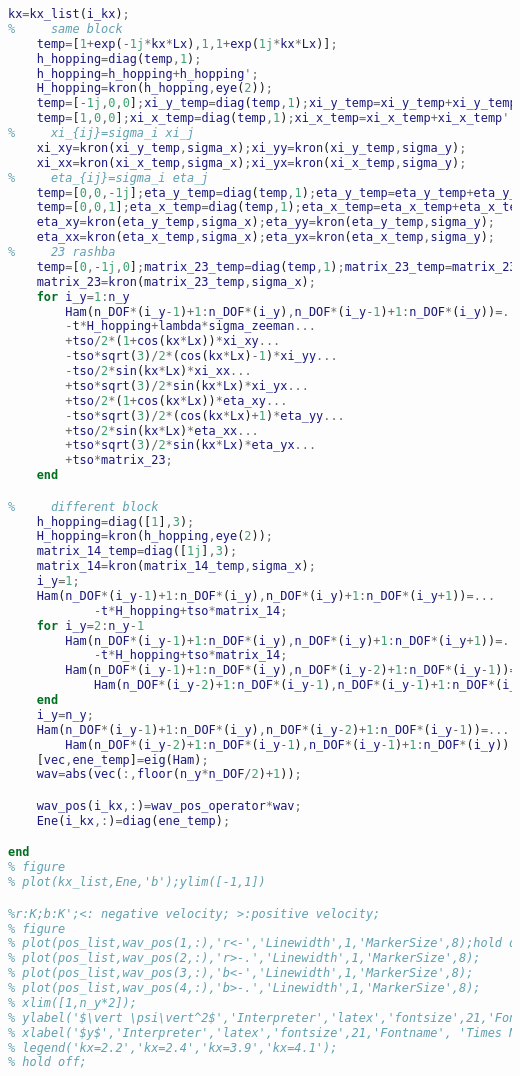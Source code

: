\begin{lstlisting}[language=matlab]
    kx=kx_list(i_kx);
%     same block
    temp=[1+exp(-1j*kx*Lx),1,1+exp(1j*kx*Lx)];
    h_hopping=diag(temp,1);
    h_hopping=h_hopping+h_hopping';
    H_hopping=kron(h_hopping,eye(2));
    temp=[-1j,0,0];xi_y_temp=diag(temp,1);xi_y_temp=xi_y_temp+xi_y_temp';
    temp=[1,0,0];xi_x_temp=diag(temp,1);xi_x_temp=xi_x_temp+xi_x_temp';
%     xi_{ij}=sigma_i xi_j
    xi_xy=kron(xi_y_temp,sigma_x);xi_yy=kron(xi_y_temp,sigma_y);
    xi_xx=kron(xi_x_temp,sigma_x);xi_yx=kron(xi_x_temp,sigma_y);
%     eta_{ij}=sigma_i eta_j
    temp=[0,0,-1j];eta_y_temp=diag(temp,1);eta_y_temp=eta_y_temp+eta_y_temp';
    temp=[0,0,1];eta_x_temp=diag(temp,1);eta_x_temp=eta_x_temp+eta_x_temp';
    eta_xy=kron(eta_y_temp,sigma_x);eta_yy=kron(eta_y_temp,sigma_y);
    eta_xx=kron(eta_x_temp,sigma_x);eta_yx=kron(eta_x_temp,sigma_y);
%     23 rashba
    temp=[0,-1j,0];matrix_23_temp=diag(temp,1);matrix_23_temp=matrix_23_temp+matrix_23_temp';
    matrix_23=kron(matrix_23_temp,sigma_x);
    for i_y=1:n_y
        Ham(n_DOF*(i_y-1)+1:n_DOF*(i_y),n_DOF*(i_y-1)+1:n_DOF*(i_y))=...
        -t*H_hopping+lambda*sigma_zeeman...
        +tso/2*(1+cos(kx*Lx))*xi_xy...
        -tso*sqrt(3)/2*(cos(kx*Lx)-1)*xi_yy...
        -tso/2*sin(kx*Lx)*xi_xx...
        +tso*sqrt(3)/2*sin(kx*Lx)*xi_yx...
        +tso/2*(1+cos(kx*Lx))*eta_xy...
        -tso*sqrt(3)/2*(cos(kx*Lx)+1)*eta_yy...
        +tso/2*sin(kx*Lx)*eta_xx...
        +tso*sqrt(3)/2*sin(kx*Lx)*eta_yx...
        +tso*matrix_23;
    end

%     different block
    h_hopping=diag([1],3);
    H_hopping=kron(h_hopping,eye(2));
    matrix_14_temp=diag([1j],3);
    matrix_14=kron(matrix_14_temp,sigma_x);
    i_y=1;
    Ham(n_DOF*(i_y-1)+1:n_DOF*(i_y),n_DOF*(i_y)+1:n_DOF*(i_y+1))=...
            -t*H_hopping+tso*matrix_14;
    for i_y=2:n_y-1
        Ham(n_DOF*(i_y-1)+1:n_DOF*(i_y),n_DOF*(i_y)+1:n_DOF*(i_y+1))=...
            -t*H_hopping+tso*matrix_14;
        Ham(n_DOF*(i_y-1)+1:n_DOF*(i_y),n_DOF*(i_y-2)+1:n_DOF*(i_y-1))=...
            Ham(n_DOF*(i_y-2)+1:n_DOF*(i_y-1),n_DOF*(i_y-1)+1:n_DOF*(i_y))';
    end
    i_y=n_y;
    Ham(n_DOF*(i_y-1)+1:n_DOF*(i_y),n_DOF*(i_y-2)+1:n_DOF*(i_y-1))=...
        Ham(n_DOF*(i_y-2)+1:n_DOF*(i_y-1),n_DOF*(i_y-1)+1:n_DOF*(i_y))';
    [vec,ene_temp]=eig(Ham);
    wav=abs(vec(:,floor(n_y*n_DOF/2)+1));

    wav_pos(i_kx,:)=wav_pos_operator*wav;
    Ene(i_kx,:)=diag(ene_temp);

end
% figure
% plot(kx_list,Ene,'b');ylim([-1,1])

%r:K;b:K';<: negative velocity; >:positive velocity;
% figure
% plot(pos_list,wav_pos(1,:),'r<-','Linewidth',1,'MarkerSize',8);hold on;
% plot(pos_list,wav_pos(2,:),'r>-.','Linewidth',1,'MarkerSize',8);
% plot(pos_list,wav_pos(3,:),'b<-','Linewidth',1,'MarkerSize',8);
% plot(pos_list,wav_pos(4,:),'b>-.','Linewidth',1,'MarkerSize',8);
% xlim([1,n_y*2]);
% ylabel('$\vert \psi\vert^2$','Interpreter','latex','fontsize',21,'Fontname', 'Times New Roman');
% xlabel('$y$','Interpreter','latex','fontsize',21,'Fontname', 'Times New Roman');
% legend('kx=2.2','kx=2.4','kx=3.9','kx=4.1');
% hold off;


\end{lstlisting}
